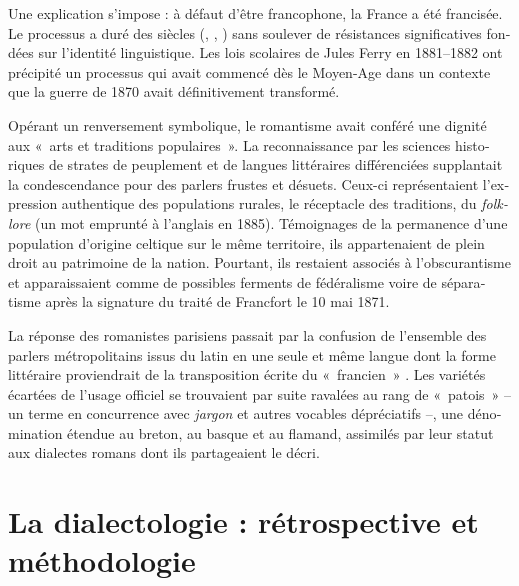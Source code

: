 \documentclass[output=paper]{../langscibook}
\begin{document}
\begin{otherlanguage}{french}
Une explication s’impose : à défaut d’être francophone, la France a été francisée. Le processus a duré des siècles (\citealt{brunot_histoire_1905}, \citealt{boyer_dix_2001}, \citealt{kremnitz_histoire_2013}) sans soulever de résistances significatives fondées sur l’identité linguistique. Les lois scolaires de Jules Ferry en 1881--1882 ont précipité un processus qui avait commencé dès le Moyen-Age dans un contexte que la guerre de 1870 avait définitivement transformé. 

Opérant un renversement symbolique, le romantisme avait conféré une dignité aux «~arts et traditions populaires~». La reconnaissance par les sciences historiques de strates de peuplement et de langues littéraires différenciées supplantait la condescendance pour des parlers frustes et désuets. Ceux-ci représentaient l’expression authentique des populations rurales, le réceptacle des traditions, du \textit{folklore} (un mot emprunté à l’anglais en 1885). Témoignages de la permanence d’une population d’origine celtique sur le même territoire, ils appartenaient de plein droit au patrimoine de la nation. Pourtant, ils restaient associés à l’obscurantisme et apparaissaient comme de possibles ferments de fédéralisme voire de séparatisme après la signature du traité de Francfort le 10 mai 1871. 

La réponse des romanistes parisiens passait par la confusion de l’ensemble des parlers métropolitains issus du latin en une seule et même langue dont la forme littéraire proviendrait de la transposition écrite du «~francien~» \citep{auroux_definition_1996}. Les variétés écartées de l’usage officiel se trouvaient par suite ravalées au rang de «~patois~» – un terme en concurrence avec \textit{jargon} et autres vocables dépréciatifs –, une dénomination étendue au breton, au basque et au flamand, assimilés par leur statut aux dialectes romans dont ils partageaient le décri.

\section{La dialectologie : rétrospective et méthodologie}
 

\end{otherlanguage}
\end{document}
